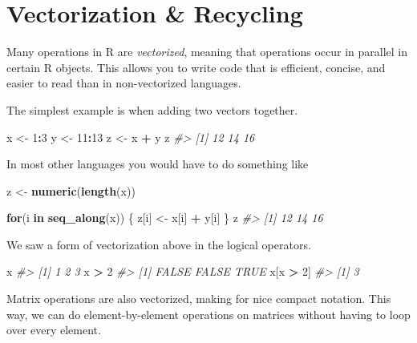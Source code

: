 \documentclass[]{book}
\newenvironment{Shaded}{\begin{snugshade}}{\end{snugshade}}
\newcommand{\CommentTok}[1]{\textcolor[rgb]{0.56,0.35,0.01}{\textit{#1}}}
\newcommand{\ControlFlowTok}[1]{\textcolor[rgb]{0.13,0.29,0.53}{\textbf{#1}}}
\newcommand{\DecValTok}[1]{\textcolor[rgb]{0.00,0.00,0.81}{#1}}
\newcommand{\KeywordTok}[1]{\textcolor[rgb]{0.13,0.29,0.53}{\textbf{#1}}}
\newcommand{\NormalTok}[1]{#1}
\newcommand{\OperatorTok}[1]{\textcolor[rgb]{0.81,0.36,0.00}{\textbf{#1}}}
\newcommand{\StringTok}[1]{\textcolor[rgb]{0.31,0.60,0.02}{#1}}
\theoremstyle{definition}
\theoremstyle{definition}
\theoremstyle{definition}
\theoremstyle{remark}
\begin{document}
\hypertarget{vectorization-recycling}{%
\section{Vectorization \& Recycling}\label{vectorization-recycling}}

Many operations in R are \emph{vectorized}, meaning that operations
occur in parallel in certain R objects. This allows you to write code
that is efficient, concise, and easier to read than in non-vectorized
languages.

The simplest example is when adding two vectors together.

\begin{Shaded}
\begin{Highlighting}[]
\NormalTok{x <-}\StringTok{ }\DecValTok{1}\OperatorTok{:}\DecValTok{3}
\NormalTok{y <-}\StringTok{ }\DecValTok{11}\OperatorTok{:}\DecValTok{13}
\NormalTok{z <-}\StringTok{ }\NormalTok{x }\OperatorTok{+}\StringTok{ }\NormalTok{y}
\NormalTok{z}
\CommentTok{#> [1] 12 14 16}
\end{Highlighting}
\end{Shaded}

In most other languages you would have to do something like

\begin{Shaded}
\begin{Highlighting}[]
\NormalTok{z <-}\StringTok{ }\KeywordTok{numeric}\NormalTok{(}\KeywordTok{length}\NormalTok{(x))}

\ControlFlowTok{for}\NormalTok{(i }\ControlFlowTok{in} \KeywordTok{seq_along}\NormalTok{(x)) \{}
\NormalTok{      z[i] <-}\StringTok{ }\NormalTok{x[i] }\OperatorTok{+}\StringTok{ }\NormalTok{y[i]}
\NormalTok{\}}
\NormalTok{z}
\CommentTok{#> [1] 12 14 16}
\end{Highlighting}
\end{Shaded}

We saw a form of vectorization above in the logical operators.

\begin{Shaded}
\begin{Highlighting}[]
\NormalTok{x}
\CommentTok{#> [1] 1 2 3}
\NormalTok{x }\OperatorTok{>}\StringTok{ }\DecValTok{2}
\CommentTok{#> [1] FALSE FALSE  TRUE}
\NormalTok{x[x }\OperatorTok{>}\StringTok{ }\DecValTok{2}\NormalTok{]}
\CommentTok{#> [1] 3}
\end{Highlighting}
\end{Shaded}

Matrix operations are also vectorized, making for nice compact notation.
This way, we can do element-by-element operations on matrices without
having to loop over every element.
\end{document}
